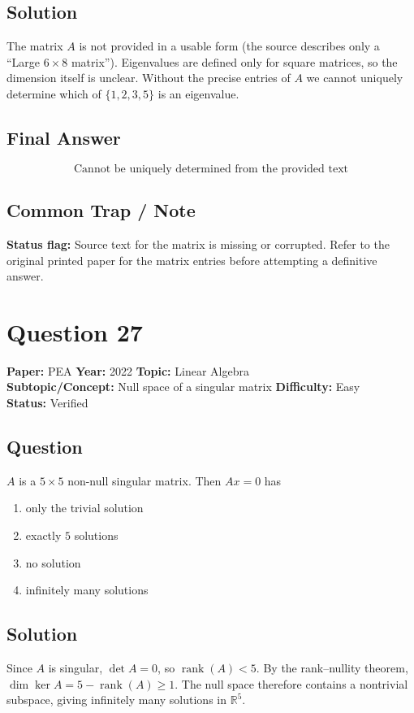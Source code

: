 \documentclass[11pt]{article}
\begin{document}
\subsection*{Solution}
The matrix $A$ is not provided in a usable form (the source describes only a ``Large $6\times8$
matrix''). Eigenvalues are defined only for square matrices, so the dimension itself is
unclear. Without the precise entries of $A$ we cannot uniquely determine which of $\{1,2,3,5\}$
is an eigenvalue.

\subsection*{Final Answer}
\[
\boxed{\text{Cannot be uniquely determined from the provided text}}
\]

\subsection*{Common Trap / Note}
\textbf{Status flag:} Source text for the matrix is missing or corrupted. Refer to the
original printed paper for the matrix entries before attempting a definitive answer.

\section*{Question 27}
\textbf{Paper:} PEA \quad \textbf{Year:} 2022 \quad \textbf{Topic:} Linear Algebra \\
\textbf{Subtopic/Concept:} Null space of a singular matrix \quad \textbf{Difficulty:} Easy \\
\textbf{Status:} Verified

\subsection*{Question}
$A$ is a $5\times 5$ non-null singular matrix. Then $Ax = 0$ has
\begin{enumerate}[label=(\Alph*)]
\item only the trivial solution
\item exactly $5$ solutions
\item no solution
\item infinitely many solutions
\end{enumerate}

\subsection*{Solution}
Since $A$ is singular, $\det A = 0$, so $\operatorname{rank}(A) < 5$. By the rank--nullity theorem,
$\dim \ker A = 5 - \operatorname{rank}(A) \geq 1$. The null space therefore contains a nontrivial
subspace, giving infinitely many solutions in $\mathbb R^5$.
\end{document}
